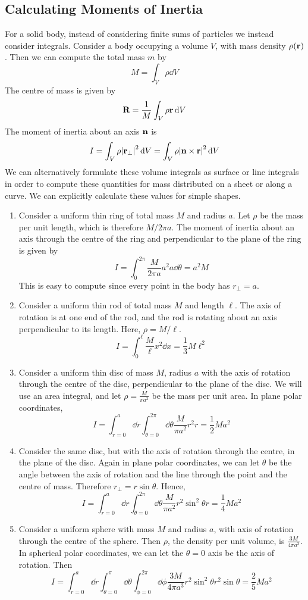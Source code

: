 \documentclass{article}
\begin{document}
\subsection{Calculating Moments of Inertia}
For a solid body, instead of considering finite sums of particles we instead consider integrals. Consider a body occupying a volume $V$, with mass density $\rho(\vb r)$. Then we can compute the total mass $m$ by
\[ M = \int_V \rho \dd{V} \]
The centre of mass is given by
\[ \vb R = \frac{1}{M} \int_V \rho \vb r \dd{V} \]
The moment of inertia about an axis $\vb n$ is
\[ I = \int_V \rho \abs{\vb r_\perp}^2 \dd{V} = \int_V \rho \abs{\vb n \times \vb r}^2 \dd{V} \]
We can alternatively formulate these volume integrals as surface or line integrals in order to compute these quantities for mass distributed on a sheet or along a curve. We can explicitly calculate these values for simple shapes.
\begin{enumerate}
	\item Consider a uniform thin ring of total mass $M$ and radius $a$. Let $\rho$ be the mass per unit length, which is therefore $M/2\pi a$. The moment of inertia about an axis through the centre of the ring and perpendicular to the plane of the ring is given by
	      \[ I = \int_0^{2\pi} \frac{M}{2\pi a} a^2 a \dd{\theta} = a^2 M \]
	      This is easy to compute since every point in the body has $r_\perp = a$.
	\item Consider a uniform thin rod of total mass $M$ and length $\ell$. The axis of rotation is at one end of the rod, and the rod is rotating about an axis perpendicular to its length. Here, $\rho = M/\ell$.
	      \[ I = \int_0^\ell \frac{M}{\ell} x^2 \dd{x} = \frac{1}{3}M\ell^2 \]
	\item Consider a uniform thin disc of mass $M$, radius $a$ with the axis of rotation through the centre of the disc, perpendicular to the plane of the disc. We will use an area integral, and let $\rho = \frac{M}{\pi a^2}$ be the mass per unit area. In plane polar coordinates,
	      \[ I = \int_{r=0}^a \dd{r} \int_{\theta = 0}^{2 \pi} \dd{\theta} \frac{M}{\pi a^2} r^2 r = \frac{1}{2}Ma^2 \]
	\item Consider the same disc, but with the axis of rotation through the centre, in the plane of the disc. Again in plane polar coordinates, we can let $\theta$ be the angle between the axis of rotation and the line through the point and the centre of mass. Therefore $r_\perp = r\sin\theta$. Hence,
	      \[ I = \int_{r=0}^a \dd{r} \int_{\theta = 0}^{2 \pi} \dd{\theta} \frac{M}{\pi a^2} r^2 \sin^2\theta r = \frac{1}{4}Ma^2 \]
	\item Consider a uniform sphere with mass $M$ and radius $a$, with axis of rotation through the centre of the sphere. Then $\rho$, the density per unit volume, is $\frac{3M}{4\pi a^3}$. In spherical polar coordinates, we can let the $\theta = 0$ axis be the axis of rotation. Then
	      \[ I = \int_{r=0}^a \dd{r} \int_{\theta = 0}^{\pi} \dd{\theta} \int_{\phi = 0}^{2 \pi} \dd{\phi} \frac{3M}{4\pi a^3} r^2 \sin^2 \theta r^2\sin\theta = \frac{2}{5}Ma^2 \]
\end{enumerate}
\end{document}
